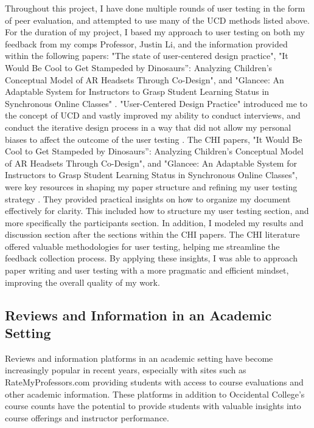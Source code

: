 \documentclass[10pt,twocolumn]{article}
\begin{document}
Throughout this project, I have done multiple rounds of user testing in the form of peer evaluation, and attempted to use many of the UCD methods listed above. For the duration of my project, I based my approach to user testing on both my feedback from my comps Professor, Justin Li, and the information provided within the following papers: "The state of user-centered design practice", "It Would Be Cool to Get Stampeded by Dinosaurs”: Analyzing Children's Conceptual Model of AR Headsets Through Co-Design", and "Glancee: An Adaptable System for Instructors to Grasp Student Learning Status in Synchronous Online Classes" \cite{woodward2022}\cite{mao2005}\cite{@ma2022}. "User-Centered Design Practice" introduced me to the concept of UCD and vastly improved my ability to conduct interviews, and conduct the iterative design process in a way that did not allow my personal biases to affect the outcome of the user testing \cite{mao2005}. The CHI papers, "It Would Be Cool to Get Stampeded by Dinosaurs”: Analyzing Children's Conceptual Model of AR Headsets Through Co-Design", and "Glancee: An Adaptable System for Instructors to Grasp Student Learning Status in Synchronous Online Classes", were key resources in shaping my paper structure and refining my user testing strategy \cite{woodward2022}\cite{@ma2022}. They provided practical insights on how to organize my document effectively for clarity. This included how to structure my user testing section, and more specifically the participants section. In addition, I modeled my results and discussion section after the sections within the CHI papers. The CHI literature offered valuable methodologies for user testing, helping me streamline the feedback collection process. By applying these insights, I was able to approach paper writing and user testing with a more pragmatic and efficient mindset, improving the overall quality of my work.  

\subsection{Reviews and Information in an Academic Setting}
Reviews and information platforms in an academic setting have become increasingly popular in recent years, especially with sites such as RateMyProfessors.com providing students with access to course evaluations and other academic information. These platforms in addition to Occidental College's course counts have the potential to provide students with valuable insights into course offerings and instructor performance.
\end{document}
